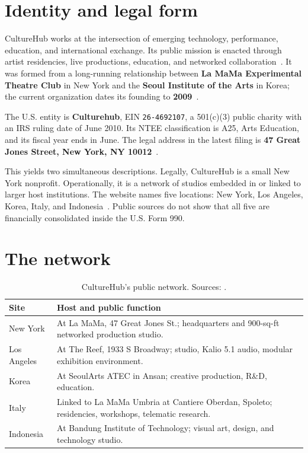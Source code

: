 \documentclass[10pt,letterpaper,twocolumn]{article}
\begin{document}
\section{Identity and legal form}

CultureHub works at the intersection of emerging technology, performance, education, and international exchange. Its public mission is enacted through artist residencies, live productions, education, and networked collaboration~\citep{chabout}. It was formed from a long-running relationship between \textbf{La MaMa Experimental Theatre Club} in New York and the \textbf{Seoul Institute of the Arts} in Korea; the current organization dates its founding to \textbf{2009}~\citep{chabout}.

The U.S. entity is \textbf{Culturehub}, EIN \texttt{26-4692107}, a 501(c)(3) public charity with an IRS ruling date of June 2010. Its NTEE classification is A25, Arts Education, and its fiscal year ends in June. The legal address in the latest filing is \textbf{47 Great Jones Street, New York, NY 10012}~\citep{ch990}.

This yields two simultaneous descriptions. Legally, CultureHub is a small New York nonprofit. Operationally, it is a network of studios embedded in or linked to larger host institutions. The website names five locations: New York, Los Angeles, Korea, Italy, and Indonesia~\citep{chabout}. Public sources do not show that all five are financially consolidated inside the U.S. Form 990.

\section{The network}

\begin{table}[H]
\footnotesize\centering\setlength{\tabcolsep}{3pt}
\begin{tabularx}{\columnwidth}{lX}
\toprule
\textbf{Site} & \textbf{Host and public function}\\
\midrule
New York & At La MaMa, 47 Great Jones St.; headquarters and 900-sq-ft networked production studio.\\
Los Angeles & At The Reef, 1933 S Broadway; studio, Kalio 5.1 audio, modular exhibition environment.\\
Korea & At SeoulArts ATEC in Ansan; creative production, R\&D, education.\\
Italy & Linked to La MaMa Umbria at Cantiere Oberdan, Spoleto; residencies, workshops, telematic research.\\
Indonesia & At Bandung Institute of Technology; visual art, design, and technology studio.\\
\bottomrule
\end{tabularx}
\caption{CultureHub's public network. Sources: \citet{chny,chla,chkorea,chitaly,chindonesia}.}
\end{table}
\end{document}
